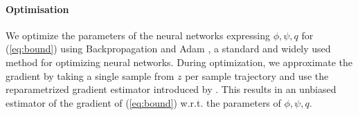 \documentclass[11pt,letterpaper]{article}
\newcounter{theorem}
\newtheorem{proposition}[theorem]{Proposition}
\begin{document}


%	
%	
%	
%
%
%
%
%
%
%
%

\paragraph{Optimisation}
We optimize the parameters of the neural networks expressing $\phi, \psi, q$ for (\ref{eq:bound}) using Backpropagation and Adam \citep{kingma-adam:-2014}, a standard and widely used method for optimizing neural networks.
During optimization, we approximate the gradient by taking a single sample from $z$ per sample trajectory and use the reparametrized gradient estimator introduced by \citet{kingma-auto-encoding-2014}.
This results in an unbiased estimator of the gradient of (\ref{eq:bound}) w.r.t. the parameters of $\phi, \psi, q$.
\end{document}
